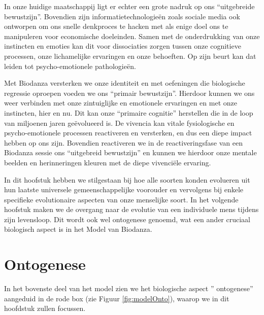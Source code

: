 \documentclass[
  11pt,
]{book}
\begin{document}
In onze huidige maatschappij ligt er echter een grote nadruk op ons ``uitgebreide bewustzijn''. Bovendien zijn informatietechnologieën zoals sociale media ook ontworpen om ons snelle denkproces te hacken met als enige doel ons te manipuleren voor economische doeleinden. Samen met de onderdrukking van onze instincten en emoties kan dit voor dissociaties zorgen tussen onze cognitieve processen, onze lichamelijke ervaringen en onze behoeften. Op zijn beurt kan dat leiden tot psycho-emotionele pathologieën.

Met Biodanza versterken we onze identiteit en met oefeningen die biologische regressie oproepen voeden we ons ``primair bewustzijn''.
Hierdoor kunnen we ons weer verbinden met onze zintuiglijke en emotionele ervaringen en met onze instincten, hier en nu. Dit kan onze ``primaire cognitie'' herstellen die in de loop van miljoenen jaren geëvolueerd is. De vivencia kan vitale fysiologische en psycho-emotionele processen reactiveren en versterken, en dus een diepe impact hebben op ons zijn. Bovendien reactiveren we in de reactiveringsfase van een Biodanza sessie ons ``uitgebreid bewustzijn'' en kunnen we hierdoor onze mentale beelden en herinneringen kleuren met de diepe vivenciële ervaring.

In dit hoofstuk hebben we stilgestaan bij hoe alle soorten konden evolueren uit hun laatste universele gemeenschappelijke voorouder en vervolgens bij enkele specifieke evolutionaire aspecten van onze menselijke soort.
In het volgende hoofstuk maken we de overgang naar de evolutie van een individuele mens tijdens zijn levensloop. Dit wordt ook wel ontogenese genoemd, wat een ander cruciaal biologisch aspect is in het Model van Biodanza.

\hypertarget{ontogenese}{%
\chapter{Ontogenese}\label{ontogenese}}

In het bovenste deel van het model zien we het biologische aspect '' ontogenese'' aangeduid in de rode box (zie Figuur \ref{fig:modelOnto}), waarop we in dit hoofdstuk zullen focussen.
\end{document}
